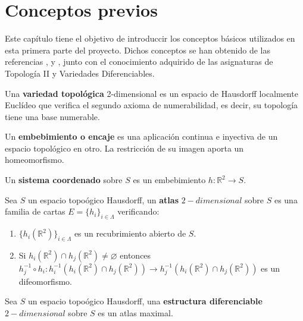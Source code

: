 
\chapter{Conceptos previos}

Este capítulo tiene el objetivo de introduccir los conceptos básicos utilizados en esta primera parte del proyecto. Dichos conceptos se han obtenido de las referencias \cite{MorseTh1}, \cite{MorseTh2} y \cite{Triangulacion}, junto con el conocimiento adquirido de las asignaturas de Topología II y Variedades Diferenciables.

\begin{definicion} Una \textbf{variedad topológica} 2-dimensional es un espacio de Hausdorff localmente Euclídeo que verifica el segundo axioma de numerabilidad, es decir, su topología tiene una base numerable.
\end{definicion}

\begin{definicion} Un \textbf{embebimiento o encaje} es una aplicación continua e inyectiva de un espacio topológico en otro. La restricción de su imagen aporta un homeomorfismo.
\end{definicion}

\begin{definicion} Un \textbf{sistema coordenado} sobre $S$ es un embebimiento $h : \mathbb{R}^2 \rightarrow S$.
\end{definicion}

\begin{definicion} Sea $S$ un espacio topoógico Hausdorff, un \textbf{atlas} $2-dimensional$ sobre $S$ es una familia de cartas $E=\{h_i\}_{i\in \Lambda}$ verificando:
	\begin{enumerate}
		\item $\{h_i(\mathbb{R}^2)\}_{i\in \Lambda}$ es un recubrimiento abierto de $S$.
		\item Si $h_i(\mathbb{R}^2) \cap h_j(\mathbb{R}^2) \neq \varnothing$ entonces $h_j^{-1} \circ h_i:h_i^{-1}(h_i(\mathbb{R}^2)\cap h_j(\mathbb{R}^2)) \rightarrow h_j^{-1}(h_i(\mathbb{R}^2)\cap h_j(\mathbb{R}^2))$ es un difeomorfismo.
	\end{enumerate}
\end{definicion}

\begin{definicion} Sea $S$ un espacio topoógico Hausdorff, una \textbf{estructura diferenciable} $2-dimensional$ sobre $S$ es un atlas maximal.
\end{definicion}

